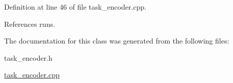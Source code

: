 \-Definition at line 46 of file task\-\_\-encoder.\-cpp.



\-References runs.



\-The documentation for this class was generated from the following files\-:\begin{DoxyCompactItemize}
\item 
task\-\_\-encoder.\-h\item 
\hyperlink{task__encoder_8cpp}{task\-\_\-encoder.\-cpp}\end{DoxyCompactItemize}
